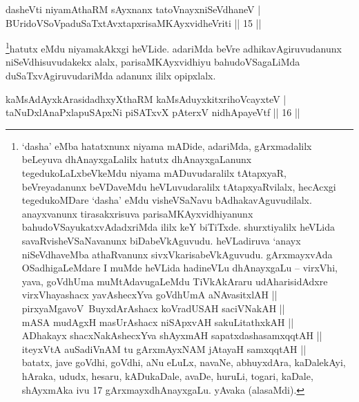 
\begin{shl}
dasheVti niyamAthaRM sAyxnanx tatoV\s nayxniSeVdhaneV | \\
BUridoVSoVpaduSaTxtAvxtapxrisaMKAyxvidheVriti \hfill|| 15 || 
\end{shl}

\begin{artha}
\footnote{`dasha' eMba hatatxnunx niyama mADide, adariMda, gArxmadalilx beLeyuva dhAnayxgaLalilx hatutx dhAnayxgaLanunx tegedukoLaLxbeVkeMdu niyama mADuvudaralilx tAtapxyaR, beVreyadanunx beVDaveMdu heVLuvudaralilx tAtapxyaRvilalx, hecAcxgi tegedukoMDare `dasha' eMdu visheVSaNavu bAdhakavAguvudilalx. anayxvanunx tirasakxrisuva parisaMKAyxvidhiyanunx bahudoVSayukatxvAdadxriMda ililx keY biTiTxde. shurxtiyalilx heVLida savaRvisheVSaNavanunx biDabeVkAguvudu. heVLadiruva `anayx niSeVdhaveMba athaRvanunx sivxVkarisabeVkAguvudu. gArxmayxvAda OSadhigaLeMdare I muMde heVLida hadineVLu dhAnayxgaLu {\rm --} virxVhi, yava, goVdhUma muMtAdavugaLeMdu TiVkAkAraru udAharisidAdxre \mdash  \\ virxVhayashacx yavAshecxYva goVdhUmA aNAvasitxlAH ||\\
pirxyaMgavoV\ BuyxdArAshacx koVradUSAH saciVNakAH ||\\
mASA mudAgxH masUrAshacx niSApxvAH sakuLitathxkAH ||\\
ADhakayx shacxNakAshecxYva shAyxmAH sapatxdashasamxqqtAH ||\\
iteyxVtA auSadiVnAM tu gArxmAyxNAM jAtayaH samxqqtAH ||\\ batatx, jave goVdhi, goVdhi, aNu eLuLx, navaNe, abhuyxdAra, kaDalekAyi, hAraka, ududx, hesaru, kADukaDale, avaDe, huruLi, togari, kaDale, shAyxmAka ivu 17 gArxmayxdhAnayxgaLu. yAvaka (alasaMdi).}hatutx eMdu niyamakAkxgi heVLide. adariMda beVre adhikavAgiruvudanunx niSeVdhisuvudakekx alalx, parisaMKAyxvidhiyu bahudoVSagaLiMda duSaTxvAgiruvudariMda adanunx ililx opipxlalx.
\end{artha}



\begin{shl}
kaMsAdAyxkArasidadhxyXthaRM kaMsAduyxkitxrihoVcayxteV | \\
taNuDxlAnaPxlapuSApxNi piSATxvX pAterxV nidhApayeVtf \hfill|| 16 || 
\end{shl}

